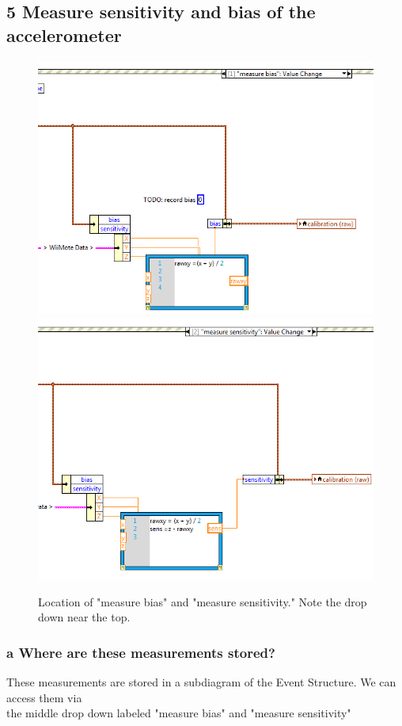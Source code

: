 \documentclass[10pt,a4paper]{article}
\begin{document}
  \subsection*{5 Measure sensitivity and bias of the accelerometer}
    \begin{figure}[h]
        \centering
        \includegraphics[scale=0.4]{../lab1_data/lab1_5b.PNG}
        \includegraphics[scale=0.4]{../lab1_data/lab1_5c.PNG}
        \caption{Location of "measure bias" and "measure sensitivity." Note the drop down near the top.}
    \end{figure}
    \subsubsection*{a Where are these measurements stored?}
    These measurements are stored in a subdiagram of the Event Structure. We can access them via \\
    the middle drop down labeled "measure bias" and "measure sensitivity"
\end{document}
